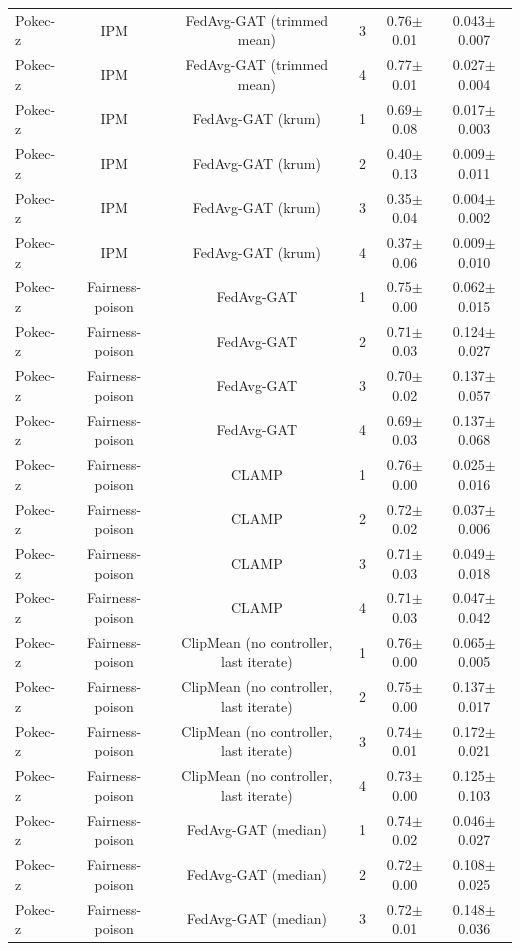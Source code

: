 \begin{table}[tbp]
\begin{tabular}{lccccc}
Pokec-z & IPM & FedAvg-GAT (trimmed mean) & 3 & 0.76$\pm$0.01 & 0.043$\pm$0.007 \\
Pokec-z & IPM & FedAvg-GAT (trimmed mean) & 4 & 0.77$\pm$0.01 & 0.027$\pm$0.004 \\
Pokec-z & IPM & FedAvg-GAT (krum) & 1 & 0.69$\pm$0.08 & 0.017$\pm$0.003 \\
Pokec-z & IPM & FedAvg-GAT (krum) & 2 & 0.40$\pm$0.13 & 0.009$\pm$0.011 \\
Pokec-z & IPM & FedAvg-GAT (krum) & 3 & 0.35$\pm$0.04 & 0.004$\pm$0.002 \\
Pokec-z & IPM & FedAvg-GAT (krum) & 4 & 0.37$\pm$0.06 & 0.009$\pm$0.010 \\
Pokec-z & Fairness-poison & FedAvg-GAT & 1 & 0.75$\pm$0.00 & 0.062$\pm$0.015 \\
Pokec-z & Fairness-poison & FedAvg-GAT & 2 & 0.71$\pm$0.03 & 0.124$\pm$0.027 \\
Pokec-z & Fairness-poison & FedAvg-GAT & 3 & 0.70$\pm$0.02 & 0.137$\pm$0.057 \\
Pokec-z & Fairness-poison & FedAvg-GAT & 4 & 0.69$\pm$0.03 & 0.137$\pm$0.068 \\
Pokec-z & Fairness-poison & CLAMP & 1 & 0.76$\pm$0.00 & 0.025$\pm$0.016 \\
Pokec-z & Fairness-poison & CLAMP & 2 & 0.72$\pm$0.02 & 0.037$\pm$0.006 \\
Pokec-z & Fairness-poison & CLAMP & 3 & 0.71$\pm$0.03 & 0.049$\pm$0.018 \\
Pokec-z & Fairness-poison & CLAMP & 4 & 0.71$\pm$0.03 & 0.047$\pm$0.042 \\
Pokec-z & Fairness-poison & ClipMean (no controller, last iterate) & 1 & 0.76$\pm$0.00 & 0.065$\pm$0.005 \\
Pokec-z & Fairness-poison & ClipMean (no controller, last iterate) & 2 & 0.75$\pm$0.00 & 0.137$\pm$0.017 \\
Pokec-z & Fairness-poison & ClipMean (no controller, last iterate) & 3 & 0.74$\pm$0.01 & 0.172$\pm$0.021 \\
Pokec-z & Fairness-poison & ClipMean (no controller, last iterate) & 4 & 0.73$\pm$0.00 & 0.125$\pm$0.103 \\
Pokec-z & Fairness-poison & FedAvg-GAT (median) & 1 & 0.74$\pm$0.02 & 0.046$\pm$0.027 \\
Pokec-z & Fairness-poison & FedAvg-GAT (median) & 2 & 0.72$\pm$0.00 & 0.108$\pm$0.025 \\
Pokec-z & Fairness-poison & FedAvg-GAT (median) & 3 & 0.72$\pm$0.01 & 0.148$\pm$0.036 \\

\end{tabular}
\end{table}

